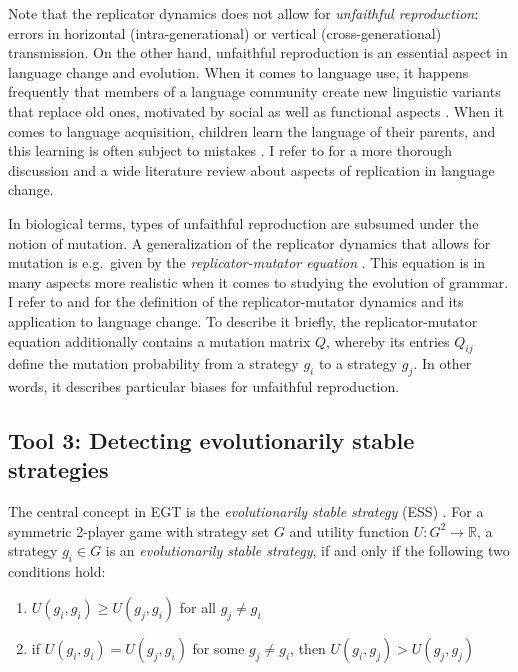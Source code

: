 \documentclass[output=paper,hidelinks]{langscibook}
\begin{document}
Note that the replicator dynamics does not allow for \emph{unfaithful reproduction}: errors in horizontal (intra-generational) or vertical (cross-generational) transmission. On the other hand, unfaithful reproduction is an essential aspect in language change and evolution.  When it comes to language use, it happens frequently that members of a language community create new linguistic variants that replace old ones, motivated by social as well as functional aspects \citep[cf.][]{Croft2000}. When it comes to language acquisition, children learn the language of their parents, and this learning is often subject to mistakes \citep[cf.][]{Nowak_2001}. I refer to \citet{rosenbach_08} for a more thorough discussion and a wide literature review about aspects of replication in language change. 

In biological terms, types of unfaithful reproduction are subsumed under the notion of mutation. A generalization of the replicator dynamics that allows for mutation is e.g.~given by the \emph{replicator-mutator equation} \citep[cf.][]{Nowak_2002}. This equation is in many aspects more realistic when it comes to studying the evolution of grammar. I refer to \citet{Nowak_2001} and \citet{Deo_2015} for the definition of the replicator-mutator dynamics and its application to language change. To describe it briefly, the replicator-mutator equation additionally contains a mutation matrix $Q$, whereby its entries $Q_{ij}$ define the mutation probability from a strategy $g_i$ to a strategy $g_j$. In other words, it describes particular biases for unfaithful reproduction. 


\subsection{Tool 3: Detecting evolutionarily stable strategies}
\label{Sec:tool3}

The central concept in EGT is the \emph{evolutionarily stable  strategy} (ESS) \citep[cf.][]{Maynard73, Maynard82}. For a symmetric 2-player game with strategy set $G$ and utility function $U: G^2 \rightarrow \mathbb{R}$, a strategy $g_i \in G$ is an \emph{evolutionarily stable strategy}, if and only if the following two conditions hold:
\begin{enumerate}
\item $U(g_i,g_i) \geq U(g_j,g_i)$ for all $g_j \neq g_i$
\item if $U(g_i,g_i) = U(g_j,g_i)$ for some $g_j \neq g_i$, then $U(g_i,g_j) > U(g_j,g_j)$
\end{enumerate}
\end{document}
